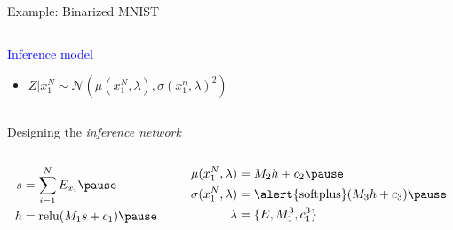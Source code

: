 \documentclass[14pt, aspectratio=169]{beamer}
\begin{document}
\begin{frame}{Example: Binarized MNIST}


\begin{columns}
	\begin{column}{0.75\textwidth}  
   		\textcolor{blue}{Inference model}
		\begin{itemize}
			\item $Z|x_1^N \sim \mathcal N(\mu(x_1^N, \lambda), \sigma(x_1^n, \lambda)^2)$
		\end{itemize}
    \end{column}
	\begin{column}{0.2\textwidth}
    \end{column}    
    \end{columns}
    \pause
    
    Designing the \emph{inference network}\pause
    \vspace{-10pt}
    \begin{columns}
    \begin{column}{0.35\textwidth}
    \begin{equation*}
	\begin{aligned}		
		s &= \sum_{i=1}^N E_{x_i} \pause \\
		h &= \relu(M_1s+c_1)  \pause 		
	\end{aligned}
	\end{equation*}
	\end{column}
	\begin{column}{0.6\textwidth}
	\begin{equation*}
	\begin{aligned}		
		\mu(x_1^N, \lambda) &= M_2h + c_2  \pause \\
		\sigma(x_1^N, \lambda) &= \alert{\softplus}(M_3h + c_3)  \pause \\
		\lambda &= \{E, M_1^3, c_1^3\}
	\end{aligned}
	\end{equation*}
	\end{column}
	\end{columns}
	

\end{frame}
\end{document}
